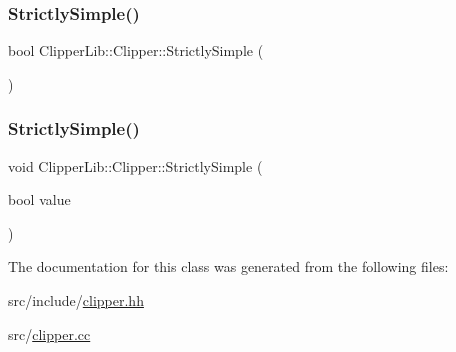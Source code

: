 \subsubsection{\texorpdfstring{StrictlySimple()}{StrictlySimple()}\hspace{0.1cm}{\footnotesize\ttfamily [1/2]}}
{\footnotesize\ttfamily bool Clipper\+Lib\+::\+Clipper\+::\+Strictly\+Simple (\begin{DoxyParamCaption}{ }\end{DoxyParamCaption})\hspace{0.3cm}{\ttfamily [inline]}}

\mbox{\label{class_clipper_lib_1_1_clipper_a85aa82d75e0d7d1f380d2e96231d6aa3}} 
\subsubsection{\texorpdfstring{StrictlySimple()}{StrictlySimple()}\hspace{0.1cm}{\footnotesize\ttfamily [2/2]}}
{\footnotesize\ttfamily void Clipper\+Lib\+::\+Clipper\+::\+Strictly\+Simple (\begin{DoxyParamCaption}\item[{bool}]{value }\end{DoxyParamCaption})\hspace{0.3cm}{\ttfamily [inline]}}



The documentation for this class was generated from the following files\+:\begin{DoxyCompactItemize}
\item 
src/include/\mbox{\hyperlink{clipper_8hh}{clipper.\+hh}}\item 
src/\mbox{\hyperlink{clipper_8cc}{clipper.\+cc}}\end{DoxyCompactItemize}
